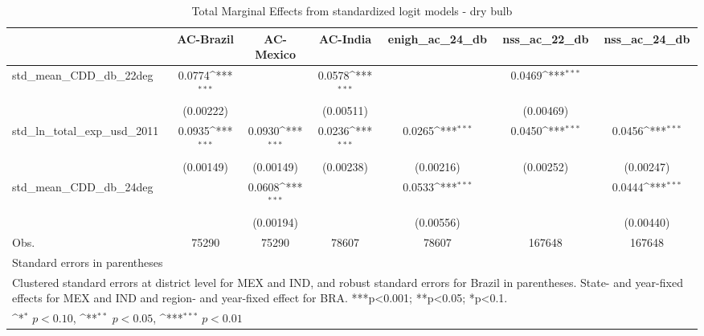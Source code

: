 \begin{table}[htbp]\centering
\def\sym#1{\ifmmode^{#1}\else\(^{#1}\)\fi}
\caption{Total Marginal Effects from standardized logit models - dry bulb}
\begin{tabular}{l*{6}{c}}
\hline\hline
            &\multicolumn{1}{c}{AC-Brazil}&\multicolumn{1}{c}{AC-Mexico}&\multicolumn{1}{c}{AC-India}&\multicolumn{1}{c}{enigh\_ac\_24\_db}&\multicolumn{1}{c}{nss\_ac\_22\_db}&\multicolumn{1}{c}{nss\_ac\_24\_db}\\
\hline
std\_mean\_CDD\_db\_22deg&      0.0774\sym{***}&                     &      0.0578\sym{***}&                     &      0.0469\sym{***}&                     \\
            &   (0.00222)         &                     &   (0.00511)         &                     &   (0.00469)         &                     \\
std\_ln\_total\_exp\_usd\_2011&      0.0935\sym{***}&      0.0930\sym{***}&      0.0236\sym{***}&      0.0265\sym{***}&      0.0450\sym{***}&      0.0456\sym{***}\\
            &   (0.00149)         &   (0.00149)         &   (0.00238)         &   (0.00216)         &   (0.00252)         &   (0.00247)         \\
std\_mean\_CDD\_db\_24deg&                     &      0.0608\sym{***}&                     &      0.0533\sym{***}&                     &      0.0444\sym{***}\\
            &                     &   (0.00194)         &                     &   (0.00556)         &                     &   (0.00440)         \\
\hline
Obs.        &       75290         &       75290         &       78607         &       78607         &      167648         &      167648         \\
\hline\hline
\multicolumn{7}{l}{\footnotesize Standard errors in parentheses}\\
\multicolumn{7}{l}{\footnotesize Clustered standard errors at district level for MEX and IND, and robust standard errors for Brazil in parentheses. State- and year-fixed effects for MEX and IND and region- and year-fixed effect for BRA. ***p<0.001; **p<0.05; *p<0.1.}\\
\multicolumn{7}{l}{\footnotesize \sym{*} \(p<0.10\), \sym{**} \(p<0.05\), \sym{***} \(p<0.01\)}\\
\end{tabular}
\end{table}

